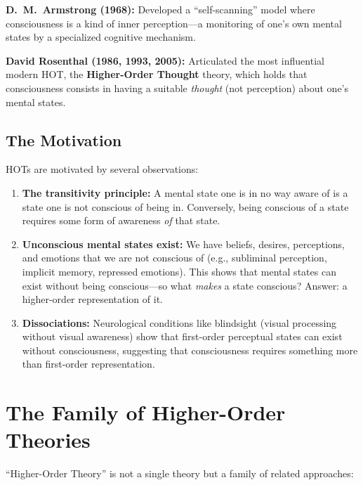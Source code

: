 \documentclass[11pt,a4paper]{report}
\begin{document}
\textbf{D.\ M.\ Armstrong (1968):} Developed a ``self-scanning'' model where consciousness is a kind of inner perception---a monitoring of one's own mental states by a specialized cognitive mechanism.

\textbf{David Rosenthal (1986, 1993, 2005):} Articulated the most influential modern HOT, the \textbf{Higher-Order Thought} theory, which holds that consciousness consists in having a suitable \emph{thought} (not perception) about one's mental states.

\subsection{The Motivation}

HOTs are motivated by several observations:

\begin{enumerate}[leftmargin=2em]
  \item \textbf{The transitivity principle:} A mental state one is in no way aware of is a state one is not conscious of being in. Conversely, being conscious of a state requires some form of awareness \emph{of} that state.
  \item \textbf{Unconscious mental states exist:} We have beliefs, desires, perceptions, and emotions that we are not conscious of (e.g., subliminal perception, implicit memory, repressed emotions). This shows that mental states can exist without being conscious---so what \emph{makes} a state conscious? Answer: a higher-order representation of it.
  \item \textbf{Dissociations:} Neurological conditions like blindsight (visual processing without visual awareness) show that first-order perceptual states can exist without consciousness, suggesting that consciousness requires something more than first-order representation.
\end{enumerate}

\section{The Family of Higher-Order Theories}

``Higher-Order Theory'' is not a single theory but a family of related approaches:
\end{document}
